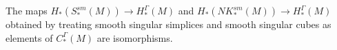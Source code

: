 \begin{comment}
	As the cubes $\interval^k$ are compact manifolds with corners equipped with their standard orientations,
	we have $SK^{sm}_*(M) \into PC_*^\Gamma$.
	Furthermore, any degenerate singular cube $\sigma \colon \interval^k \to M$ is also degenerate in the sense of Definition \ref{D: equiv triv and small}.
	In fact, it will have small rank as it filters through a projection.
	Furthermore, if that projection collapses the $i$th coordinate then each face $\sigma \delta_j^\epsilon$ for $j\neq i$ will also be a degenerate small cube and so have small rank, while the term $\pm (\sigma \delta_i^0-\sigma \delta_i^1)$ will be trivial with the trivializing map $\rho$ being the interchange of the two faces.
	Thus, the degenerate smooth singular cubes are elements of $Q_*(M)$.
	As in the simplicial case one can check compatibility of boundary orientations so that we have a chain map $NK^{sm}_*(M) \to C_*^\Gamma(M)$.
	\red{NEED TO PROVE THIS IS A CHAIN MAP}
\end{comment}

\begin{theorem}\label{T: hom iso map}
	The maps $H_*(S^{sm}_*(M)) \to H_*^\Gamma(M)$ and $H_*(NK^{sm}_*(M)) \to H_*^\Gamma(M)$ obtained by treating smooth singular simplices and smooth singular cubes as elements of $C_*^\Gamma(M)$ are isomorphisms.
\end{theorem}


